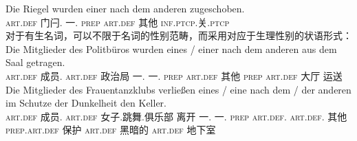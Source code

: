 \ex 
\gll Die Riegel wurden einer nach dem anderen zugeschoben.\\
	 \textsc{art}.\textsc{def} 门闩.\mas{} \passivepst{} 一.\mas{} \textsc{prep} \textsc{art}.\textsc{def} 其他 \textsc{inf}.\textsc{ptcp}.关.\textsc{ptcp}\\
\zl
对于有生名词，可以不限于名词的性别范畴，而采用对应于生理性别的状语形式：
\eal
\ex 
\gll Die Mitglieder des Politbüros wurden eines / einer nach dem anderen aus dem Saal getragen.\\
	 \textsc{art}.\textsc{def} 成员.\neu{} \textsc{art}.\textsc{def} 政治局 \passivepst{} 一.\neu{} {} 一.\mas{} \textsc{prep} \textsc{art}.\textsc{def} 其他 \textsc{prep} \textsc{art}.\textsc{def} 大厅 运送\\
\ex 
\gll Die Mitglieder des Frauentanzklubs verließen eines / eine nach dem / der anderen im Schutze der Dunkelheit den
Keller.\\
\textsc{art}.\textsc{def} 成员.\neu{} \textsc{art}.\textsc{def} 女子.跳舞.俱乐部 离开 一.\neu{} {} 一.\fem{} \textsc{prep} \textsc{art}.\textsc{def}.\neu{} {} \textsc{art}.\textsc{def}.\fem{} 其他 \textsc{prep}.\textsc{art}.\textsc{def} 保护 \textsc{art}.\textsc{def} 黑暗的 \textsc{art}.\textsc{def}
地下室\\
